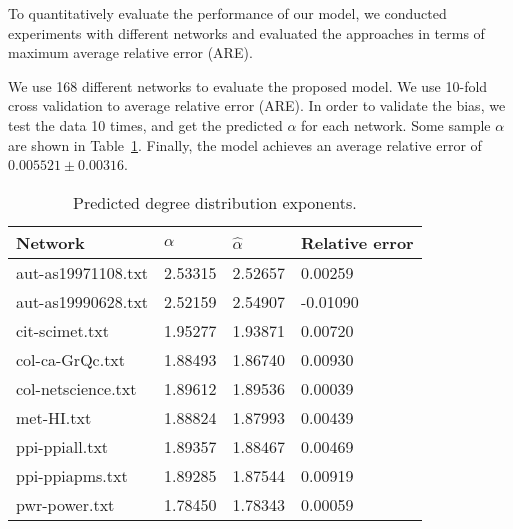 
 To quantitatively evaluate the performance of our model, we conducted experiments with different networks and evaluated the approaches in terms of maximum average relative error (ARE).

 We use 168 different networks to evaluate the proposed model. We use 10-fold cross validation to average relative error (ARE). In order to validate the bias, we test the data 10 times, and get the predicted $\alpha$ for each network.  Some sample $\alpha$ are shown in Table~\ref{table:alpha}.  Finally, the model achieves an average relative error of $0.005521 \pm 0.00316$.

%
%
%
%
%
\begin{table}[t]
\centering
\label{table:alpha}
\caption{Predicted degree distribution exponents.}
\begin{tabular}{|l|l|l|l|}
\hline
Network & $\alpha$ & $\hat{\alpha}$ & Relative error\\\hline
aut-as19971108.txt & 2.53315 & 2.52657 & 0.00259 \\\hline
aut-as19990628.txt & 2.52159 & 2.54907 & -0.01090 \\\hline
cit-scimet.txt & 1.95277 & 1.93871 & 0.00720 \\\hline
col-ca-GrQc.txt & 1.88493 & 1.86740 & 0.00930 \\\hline
col-netscience.txt & 1.89612 & 1.89536 & 0.00039 \\\hline
met-HI.txt & 1.88824 &  1.87993 & 0.00439 \\\hline
ppi-ppiall.txt & 1.89357 & 1.88467 & 0.00469 \\\hline
ppi-ppiapms.txt & 1.89285 & 1.87544 & 0.00919 \\\hline
pwr-power.txt & 1.78450 &  1.78343 & 0.00059 \\\hline
\end{tabular}
\end{table}
